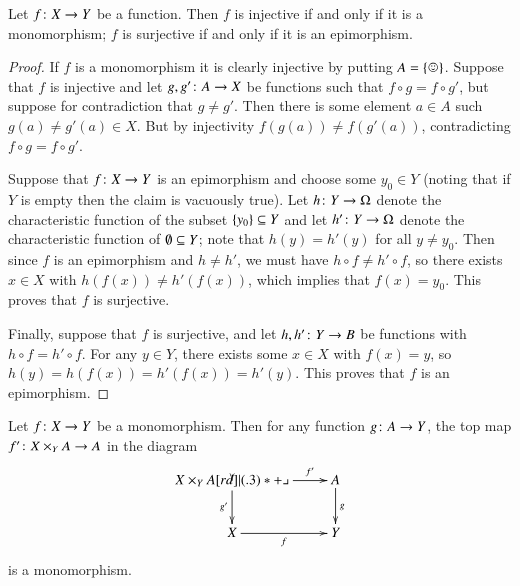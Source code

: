 \begin{proposition}\label{prop:inj and surj}

Let $f\taking X\to Y$ be a function. Then $f$ is injective if and only if it is a monomorphism; $f$ is surjective if and only if it is an epimorphism.

\end{proposition}

\begin{proof}

If $f$ is a monomorphism it is clearly injective by putting $A=\singleton$. Suppose that $f$ is injective and let $g,g'\taking A\to X$ be functions such that $f\circ g=f\circ g'$, but suppose for contradiction that $g\neq g'$. Then there is some element $a\in A$ such $g(a)\neq g'(a)\in X$. But by injectivity $f(g(a))\neq f(g'(a))$, contradicting $f\circ g=f\circ g'$.

Suppose that $f\taking X\to Y$ is an epimorphism and choose some $y_0\in Y$ (noting that if $Y$ is empty then the claim is vacuously true). Let $h\taking Y\to\Omega$ denote the characteristic function of the subset $\{y_0\}\ss Y$ and let $h'\taking Y\to\Omega$ denote the characteristic function of $\emptyset\ss Y$; note that $h(y)=h'(y)$ for all $y\neq y_0$. Then since $f$ is an epimorphism and $h\neq h'$, we must have $h\circ f\neq h'\circ f$, so there exists $x\in X$ with $h(f(x))\neq h'(f(x))$, which implies that $f(x)=y_0$. This proves that $f$ is surjective.

Finally, suppose that $f$ is surjective, and let $h,h'\taking Y\to B$ be functions with $h\circ f=h'\circ f$. For any $y\in Y$, there exists some $x\in X$ with $f(x)=y$, so $h(y)=h(f(x))=h'(f(x))=h'(y)$. This proves that $f$ is an epimorphism.

\end{proof}

\begin{proposition}\label{prop:pb preserve mono}

Let $f\taking X\to Y$ be a monomorphism. Then for any function $g\taking A\to Y$, the top map $f'\taking X\times_YA\to A$ in the diagram
$$
\xymatrix{X\times_YA\ar[r]^-{f'}\ar[d]_{g'}\ullimit&A\ar[d]^g\\X\ar[r]_f&Y}
$$
is a monomorphism.

\end{proposition}

